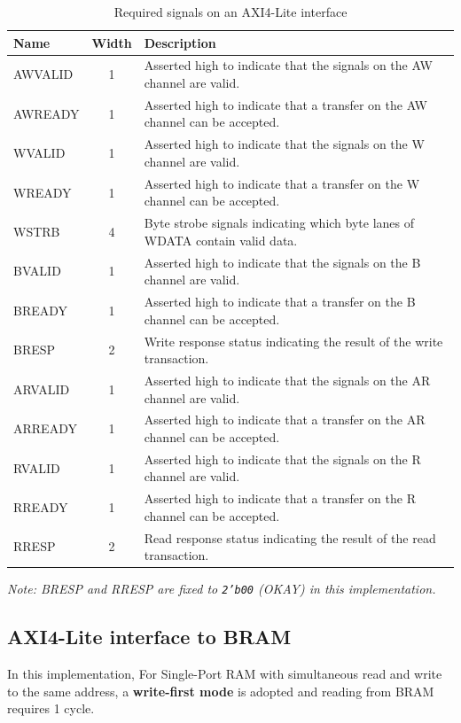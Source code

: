 \documentclass[12pt,a4paper]{report}
\begin{document}
\begin{table}[h]
\centering
\caption{Required signals on an AXI4-Lite interface}
\begin{tabular}{|l|c|p{10cm}|}
\hline
\textbf{Name} & \textbf{Width} & \textbf{Description} \\
\hline
AWVALID & 1 & Asserted high to indicate that the signals on the AW channel are valid. \\
AWREADY & 1 & Asserted high to indicate that a transfer on the AW channel can be accepted. \\
\hline
WVALID  & 1 & Asserted high to indicate that the signals on the W channel are valid. \\
WREADY  & 1 & Asserted high to indicate that a transfer on the W channel can be accepted. \\
WSTRB   & 4 & Byte strobe signals indicating which byte lanes of WDATA contain valid data. \\
\hline
BVALID  & 1 & Asserted high to indicate that the signals on the B channel are valid. \\
BREADY  & 1 & Asserted high to indicate that a transfer on the B channel can be accepted. \\
BRESP   & 2 & Write response status indicating the result of the write transaction. \\
\hline
ARVALID & 1 & Asserted high to indicate that the signals on the AR channel are valid. \\
ARREADY & 1 & Asserted high to indicate that a transfer on the AR channel can be accepted. \\
\hline
RVALID  & 1 & Asserted high to indicate that the signals on the R channel are valid. \\
RREADY  & 1 & Asserted high to indicate that a transfer on the R channel can be accepted. \\
RRESP   & 2 & Read response status indicating the result of the read transaction. \\
\hline
\end{tabular}
\end{table}

\medskip
\noindent\textit{Note: BRESP and RRESP are fixed to \texttt{2'b00} (OKAY) in this implementation.}

\newpage
\subsection{AXI4-Lite interface to BRAM}
In this implementation, For Single-Port RAM with simultaneous read and write to the same address, a \textbf{write-first mode} is adopted and reading from BRAM requires 1 cycle.
\end{document}
